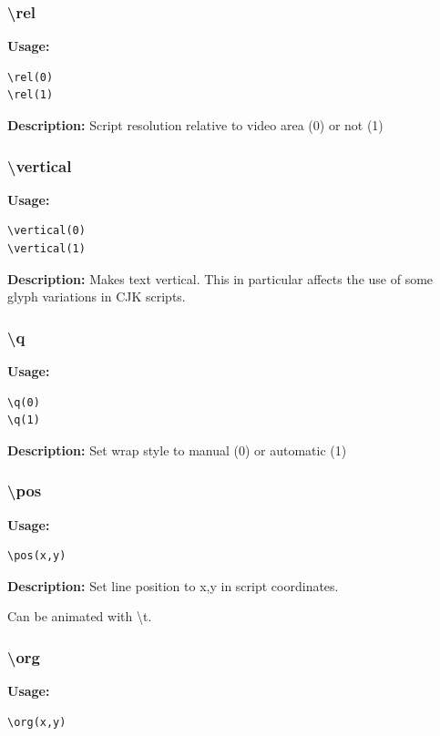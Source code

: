 \documentclass{spec}
\begin{document}
\subsubsection{\textbackslash rel}
\textbf{Usage:}
\begin{verbatim}
\rel(0)
\rel(1)
\end{verbatim}

\textbf{Description:}
Script resolution relative to video area (0) or not (1)


\subsubsection{\textbackslash vertical}
\textbf{Usage:}
\begin{verbatim}
\vertical(0)
\vertical(1)
\end{verbatim}

\textbf{Description:}
Makes text vertical. This in particular affects the use of some glyph variations in CJK scripts.


\subsubsection{\textbackslash q}
\textbf{Usage:}
\begin{verbatim}
\q(0)
\q(1)
\end{verbatim}

\textbf{Description:}
Set wrap style to manual (0) or automatic (1)

\subsubsection{\textbackslash pos}
\textbf{Usage:}
\begin{verbatim}
\pos(x,y)
\end{verbatim}

\textbf{Description:}
Set line position to x,y in script coordinates.

Can be animated with \textbackslash t.

\subsubsection{\textbackslash org}
\textbf{Usage:}
\begin{verbatim}
\org(x,y)
\end{verbatim}
\end{document}

